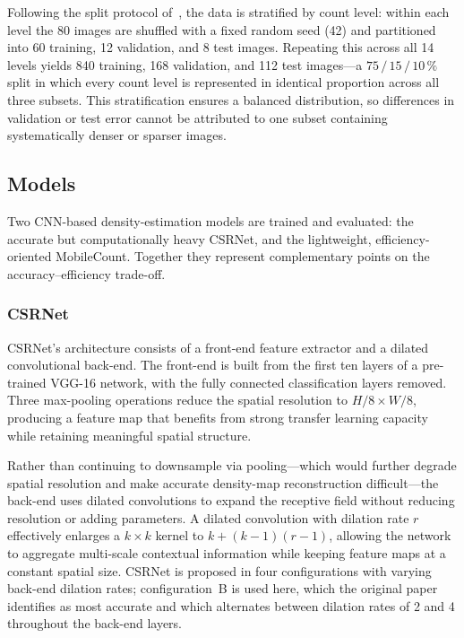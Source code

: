 \documentclass[conference]{IEEEtran}
\begin{document}
Following the split protocol of~\cite{Papadopoulos2024TenebrioVision}, the data
is stratified by count level: within each level the 80 images are shuffled with
a fixed random seed (42) and partitioned into 60 training, 12 validation, and 8
test images. Repeating this across all 14 levels yields 840 training, 168
validation, and 112 test images---a $75\,/\,15\,/\,10\,\%$ split in which every
count level is represented in identical proportion across all three subsets.
This stratification ensures a balanced distribution, so differences in
validation or test error cannot be attributed to one subset containing
systematically denser or sparser images.

\subsection{Models}
Two CNN-based density-estimation models are trained and evaluated: the accurate but computationally heavy CSRNet, and the lightweight, efficiency-oriented MobileCount. Together they represent complementary points on the accuracy–efficiency trade-off.

\subsubsection{CSRNet}
CSRNet's architecture consists of a front-end feature extractor and a dilated
convolutional back-end. The front-end is built from the first ten layers of a
pre-trained VGG-16 network, with the fully connected classification layers
removed. Three max-pooling operations reduce the spatial resolution to
$H/8 \times W/8$, producing a feature map that benefits from strong transfer
learning capacity while retaining meaningful spatial structure.

Rather than continuing to downsample via pooling---which would further degrade
spatial resolution and make accurate density-map reconstruction
difficult---the back-end uses dilated convolutions to expand the receptive field
without reducing resolution or adding parameters. A dilated convolution with
dilation rate $r$ effectively enlarges a $k \times k$ kernel to
$k + (k-1)(r-1)$, allowing the network to aggregate multi-scale contextual
information while keeping feature maps at a constant spatial size. CSRNet is proposed in four configurations with varying back-end dilation rates; configuration~B is used here, which the original paper identifies as most accurate and which alternates between dilation rates of 2 and 4 throughout the back-end layers.
\end{document}
